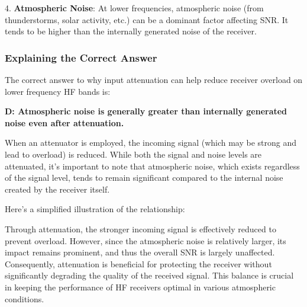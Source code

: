 4. \textbf{Atmospheric Noise}: At lower frequencies, atmospheric noise (from thunderstorms, solar activity, etc.) can be a dominant factor affecting SNR. It tends to be higher than the internally generated noise of the receiver.

\subsubsection{Explaining the Correct Answer}

The correct answer to why input attenuation can help reduce receiver overload on lower frequency HF bands is:

\textbf{D: Atmospheric noise is generally greater than internally generated noise even after attenuation.}

When an attenuator is employed, the incoming signal (which may be strong and lead to overload) is reduced. While both the signal and noise levels are attenuated, it's important to note that atmospheric noise, which exists regardless of the signal level, tends to remain significant compared to the internal noise created by the receiver itself. 

Here's a simplified illustration of the relationship:

Through attenuation, the stronger incoming signal is effectively reduced to prevent overload. However, since the atmospheric noise is relatively larger, its impact remains prominent, and thus the overall SNR is largely unaffected. Consequently, attenuation is beneficial for protecting the receiver without significantly degrading the quality of the received signal. This balance is crucial in keeping the performance of HF receivers optimal in various atmospheric conditions.
